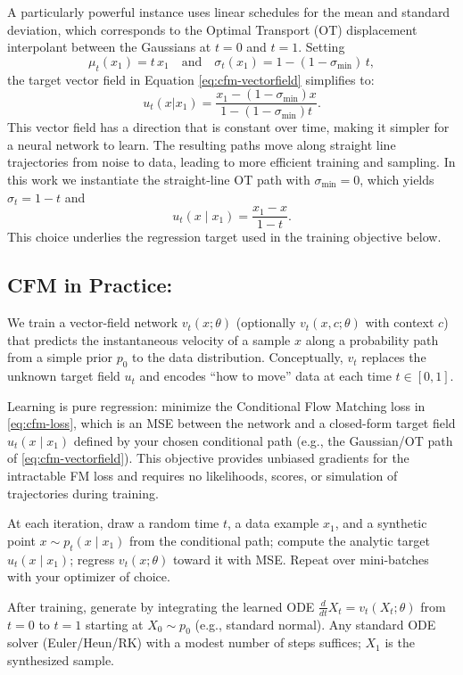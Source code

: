 \documentclass[
  manuscript=proceedings,  %
  layout=preprint,  %
  year=20xx,
  volume=x,
]{extra/joas}
\begin{document}
A particularly powerful instance uses linear schedules for the mean and standard deviation, which corresponds to the Optimal Transport (OT) displacement interpolant between the Gaussians at $t=0$ and $t=1$. Setting
$$\mu_t(x_1) = t\,x_1 \quad \text{and} \quad \sigma_t(x_1) = 1 - (1-\sigma_{\min})\,t,$$
the target vector field in Equation \eqref{eq:cfm-vectorfield} simplifies to:
$$u_t(x|x_1) = \frac{x_1 - (1-\sigma_{\min})x}{1 - (1-\sigma_{\min})t}.$$
This vector field has a direction that is constant over time, making it simpler for a neural network to learn. The resulting paths move along straight line trajectories from noise to data, leading to more efficient training and sampling. In this work we instantiate the straight-line OT path with $\sigma_{\min}{=}0$, which yields $\sigma_t{=}1{-}t$ and
\[
u_t(x\mid x_1) = \frac{x_1 - x}{1 - t}.
\]
This choice underlies the regression target used in the training objective below.

\subsection{CFM in Practice:}
\label{subsec:cfm-highlevel}

We train a vector-field network $v_t(x;\theta)$ (optionally $v_t(x,c;\theta)$ with context $c$) that predicts the instantaneous velocity of a sample $x$ along a probability path from a simple prior $p_0$ to the data distribution. Conceptually, $v_t$ replaces the unknown target field $u_t$ and encodes ``how to move'' data at each time $t\in[0,1]$.

Learning is pure regression: minimize the Conditional Flow Matching loss in \eqref{eq:cfm-loss}, which is an MSE between the network and a closed-form target field $u_t(x\!\mid\!x_1)$ defined by your chosen conditional path (e.g., the Gaussian/OT path of \eqref{eq:cfm-vectorfield}). This objective provides unbiased gradients for the intractable FM loss and requires no likelihoods, scores, or simulation of trajectories during training.

At each iteration, draw a random time $t$, a data example $x_1$, and a synthetic point $x\sim p_t(x\!\mid\!x_1)$ from the conditional path; compute the analytic target $u_t(x\!\mid\!x_1)$; regress $v_t(x;\theta)$ toward it with MSE. Repeat over mini-batches with your optimizer of choice.

After training, generate by integrating the learned ODE $\frac{d}{dt}X_t=v_t(X_t;\theta)$ from $t=0$ to $t=1$ starting at $X_0\sim p_0$ (e.g., standard normal). Any standard ODE solver (Euler/Heun/RK) with a modest number of steps suffices; $X_1$ is the synthesized sample.
\end{document}
